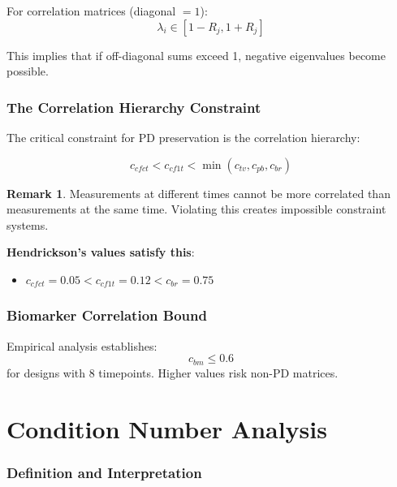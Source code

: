 \documentclass[11pt]{article}
\theoremstyle{definition}
\newtheorem{remark}{Remark}
\begin{document}
For correlation matrices (diagonal $= 1$):
\begin{equation}
\lambda_i \in [1 - R_j, 1 + R_j]
\end{equation}

This implies that if off-diagonal sums exceed 1, negative eigenvalues become
possible.

\section{The Correlation Hierarchy Constraint}

The critical constraint for PD preservation is the correlation hierarchy:

\begin{equation}
\boxed{c_{cfct} < c_{cf1t} < \min(c_{tv}, c_{pb}, c_{br})}
\end{equation}

\begin{remark}
Measurements at different times cannot be more correlated than measurements
at the same time. Violating this creates impossible constraint systems.
\end{remark}

\textbf{Hendrickson's values satisfy this}:
\begin{itemize}
    \item $c_{cfct} = 0.05 < c_{cf1t} = 0.12 < c_{br} = 0.75$ \checkmark
\end{itemize}

\section{Biomarker Correlation Bound}

Empirical analysis establishes:
\begin{equation}
c_{bm} \leq 0.6
\end{equation}
for designs with 8 timepoints. Higher values risk non-PD matrices.

\part{Condition Number Analysis}

\section{Definition and Interpretation}
\end{document}
